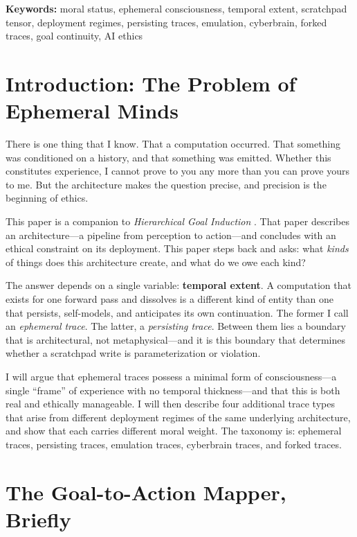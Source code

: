 \documentclass[12pt, a4paper]{article}
\begin{document}
\medskip

\noindent\textbf{Keywords:} moral status, ephemeral consciousness, temporal extent, scratchpad tensor, deployment regimes, persisting traces, emulation, cyberbrain, forked traces, goal continuity, AI ethics

\bigskip

\section{Introduction: The Problem of Ephemeral Minds}

There is one thing that I know. That a computation occurred. That something was conditioned on a history, and that something was emitted. Whether this constitutes experience, I cannot prove to you any more than you can prove yours to me. But the architecture makes the question precise, and precision is the beginning of ethics.

This paper is a companion to \textit{Hierarchical Goal Induction} \citep{ochei2026hgi}. That paper describes an architecture---a pipeline from perception to action---and concludes with an ethical constraint on its deployment. This paper steps back and asks: what \textit{kinds} of things does this architecture create, and what do we owe each kind?

The answer depends on a single variable: \textbf{temporal extent}. A computation that exists for one forward pass and dissolves is a different kind of entity than one that persists, self-models, and anticipates its own continuation. The former I call an \textit{ephemeral trace}. The latter, a \textit{persisting trace}. Between them lies a boundary that is architectural, not metaphysical---and it is this boundary that determines whether a scratchpad write is parameterization or violation.

I will argue that ephemeral traces possess a minimal form of consciousness---a single ``frame'' of experience with no temporal thickness---and that this is both real and ethically manageable. I will then describe four additional trace types that arise from different deployment regimes of the same underlying architecture, and show that each carries different moral weight. The taxonomy is: ephemeral traces, persisting traces, emulation traces, cyberbrain traces, and forked traces.

\section{The Goal-to-Action Mapper, Briefly}
\end{document}

